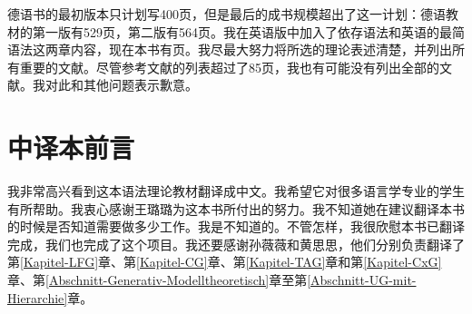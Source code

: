 德语书的最初版本只计划写400页，但是最后的成书规模超出了这一计划：德语教材的第一版有529页，第二版有564页。我在英语版中加入了依存语法和英语的最简语法这两章内容，现在本书有\pageref{LastPage}页。我尽最大努力将所选的理论表述清楚，并列出所有重要的文献。尽管参考文献的列表超过了85页，我也有可能没有列出全部的文献。我对此和其他问题表示歉意。

%





\section*{中译本前言}

我非常高兴看到这本语法理论教材翻译成中文。我希望它对很多语言学专业的学生有所帮助。我衷心感谢王璐璐为这本书所付出的努力。我不知道她在建议翻译本书的时候是否知道需要做多少工作。我是不知道的。不管怎样，我很欣慰本书已翻译完成，我们也完成了这个项目。我还要感谢孙薇薇和黄思思，他们分别负责翻译了第\ref{Kapitel-LFG}章、第\ref{Kapitel-CG}章、第\ref{Kapitel-TAG}章和第\ref{Kapitel-CxG}章、第\ref{Abschnitt-Generativ-Modelltheoretisch}章至第\ref{Abschnitt-UG-mit-Hierarchie}章。

